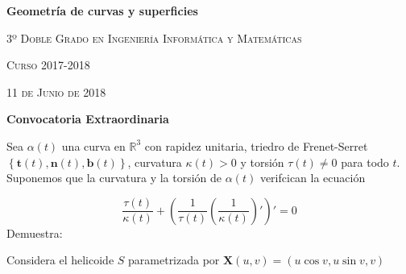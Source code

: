 \documentclass{exam}
\begin{document}
\textbf{Geometría de curvas y superficies}

\textsc{3º Doble Grado en Ingeniería Informática y Matemáticas}

\textsc{Curso 2017-2018}

\begin{flushright}
  \textsc{11 de Junio de 2018}
\end{flushright}

\begin{center}
  \textbf{Convocatoria Extraordinaria}
\end{center}

\begin{questions}
  \question Sea $\alpha(t)$ una curva en $\mathbb{R}^3$ con rapidez unitaria,
  triedro de Frenet-Serret $\left\{\textbf{t}(t), \textbf{n}(t), \textbf{b}(t)
  \right\}$, curvatura $\kappa(t) > 0$ y torsión $\tau(t) \neq 0$ para todo
  $t$. Suponemos que la curvatura y la torsión de $\alpha(t)$ verifcican la
  ecuación

  \begin{equation*}
    \dfrac{\tau(t)}{\kappa(t)} + \left(\dfrac{1}{\tau(t)} \left(
    \dfrac{1}{\kappa(t)}\right)'\right)' = 0
  \end{equation*}
  Demuestra:

  \vfill

  \question Considera el helicoide $S$ parametrizada por $\textbf{X}(u,v) =
  (u\cos v, u\sin v, v)$

\end{questions}
\end{document}
